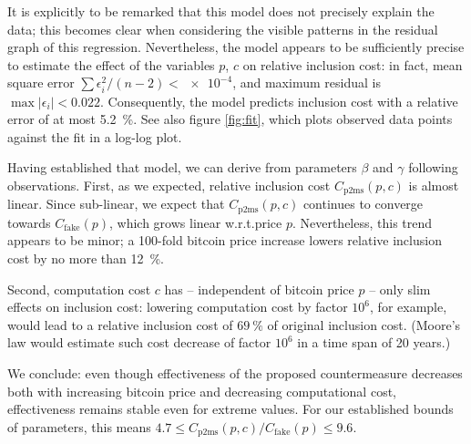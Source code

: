 \documentclass[a4paper,11pt,titlepage]{scrbook}
\begin{document}
It is explicitly to be remarked that this model does not precisely explain the data; this becomes clear when considering the visible patterns in the residual graph of this regression.
Nevertheless, the model appears to be sufficiently precise to estimate the effect of the variables $p$, $c$ on relative inclusion cost: in fact, mean square error $\sum \epsilon_i^2/(n-2) < \num{e-4}$, and maximum residual is $\max |\epsilon_i| < 0.022$. Consequently, the model predicts inclusion cost with a relative error of at most \SI{5.2}{\percent}.
See also figure \ref{fig:fit}, which plots observed data points against the fit in a log-log plot.

Having established that model, we can derive from parameters $\beta$ and $\gamma$ following observations.
First, as we expected, relative inclusion cost $C_\mathrm{p2ms}(p,c)$ is almost linear.
Since sub-linear, we expect that $C_\mathrm{p2ms}(p,c)$ continues to converge towards $C_\mathrm{fake}(p)$, which grows linear w.r.t.\@ price $p$.
Nevertheless, this trend appears to be minor; a 100-fold bitcoin price increase lowers relative inclusion cost by no more than \SI{12}{\percent}.

Second, computation cost $c$ has – independent of bitcoin price $p$ – only slim effects on inclusion cost: lowering computation cost by factor $10^6$, for example, would lead to a relative inclusion cost of $\SI{69}{\percent}$ of original inclusion cost. (Moore's law would estimate such cost decrease of factor $10^6$ in a time span of 20 years.)

We conclude: even though effectiveness of the proposed countermeasure decreases both with increasing bitcoin price and decreasing computational cost, effectiveness remains stable even for extreme values.
For our established bounds of parameters, this means $\num{4.7} \leq C_\mathrm{p2ms}(p,c) / C_\mathrm{fake}(p) \leq \num{9.6}$.
\end{document}

